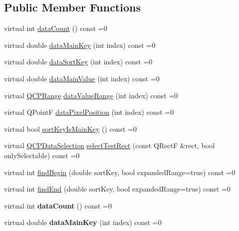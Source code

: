 \subsection*{Public Member Functions}
\begin{DoxyCompactItemize}
\item 
virtual int \hyperlink{class_q_c_p_plottable_interface1_d_a058a22c770ef4d5a0e878a7f02183da9}{data\+Count} () const =0
\item 
virtual double \hyperlink{class_q_c_p_plottable_interface1_d_a2bd60daaac046945fead558cbd83cf73}{data\+Main\+Key} (int index) const =0
\item 
virtual double \hyperlink{class_q_c_p_plottable_interface1_d_afdc92f9f01e7e35f2e96b2ea9dc14ae7}{data\+Sort\+Key} (int index) const =0
\item 
virtual double \hyperlink{class_q_c_p_plottable_interface1_d_af6330919e8023277d08c958a6074fc76}{data\+Main\+Value} (int index) const =0
\item 
virtual \hyperlink{class_q_c_p_range}{Q\+C\+P\+Range} \hyperlink{class_q_c_p_plottable_interface1_d_a9ca7fcf14d885a200879768679b19be9}{data\+Value\+Range} (int index) const =0
\item 
virtual Q\+PointF \hyperlink{class_q_c_p_plottable_interface1_d_a78911838cfbcfd2d8df9ad2fdbfb8e93}{data\+Pixel\+Position} (int index) const =0
\item 
virtual bool \hyperlink{class_q_c_p_plottable_interface1_d_a229e65e7ab968dd6cd0e259fa504b79d}{sort\+Key\+Is\+Main\+Key} () const =0
\item 
virtual \hyperlink{class_q_c_p_data_selection}{Q\+C\+P\+Data\+Selection} \hyperlink{class_q_c_p_plottable_interface1_d_a67093e4ccf490ff5f7750640941ff34c}{select\+Test\+Rect} (const Q\+RectF \&rect, bool only\+Selectable) const =0
\item 
virtual int \hyperlink{class_q_c_p_plottable_interface1_d_a5b95783271306a4de97be54eac1e7d13}{find\+Begin} (double sort\+Key, bool expanded\+Range=true) const =0
\item 
virtual int \hyperlink{class_q_c_p_plottable_interface1_d_a5deced1016bc55a41a2339619045b295}{find\+End} (double sort\+Key, bool expanded\+Range=true) const =0
\item 
virtual int {\bfseries data\+Count} () const =0\hypertarget{class_q_c_p_plottable_interface1_d_adf4ce17d263b506df80d0ac37e497432}{}\label{class_q_c_p_plottable_interface1_d_adf4ce17d263b506df80d0ac37e497432}

\item 
virtual double {\bfseries data\+Main\+Key} (int index) const =0\hypertarget{class_q_c_p_plottable_interface1_d_a572ed2583cb6a2bb590a265c3fc2b004}{}\label{class_q_c_p_plottable_interface1_d_a572ed2583cb6a2bb590a265c3fc2b004}


\end{DoxyCompactItemize}
